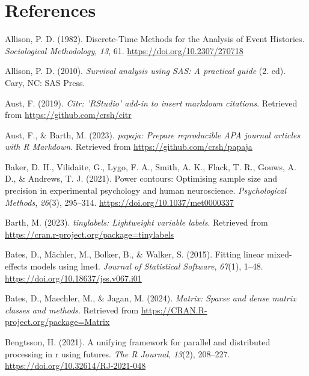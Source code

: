 \documentclass[
  man,floatsintext]{apa6}
\newlength{\cslhangindent}
\newenvironment{CSLReferences}[2] %
 {\begin{list}{}{%
  \setlength{\itemindent}{0pt}
  \setlength{\leftmargin}{0pt}
  \setlength{\parsep}{0pt}
  \ifodd #1
   \setlength{\leftmargin}{\cslhangindent}
   \setlength{\itemindent}{-1\cslhangindent}
  \fi
  \setlength{\itemsep}{#2\baselineskip}}}
 {\end{list}}
\begin{document}
\newpage

\section{References}\label{references}

\label{refs}
\begin{CSLReferences}{1}{0}
Allison, P. D. (1982). Discrete-{Time Methods} for the {Analysis} of {Event Histories}. \emph{Sociological Methodology}, \emph{13}, 61. \url{https://doi.org/10.2307/270718}

Allison, P. D. (2010). \emph{Survival analysis using {SAS}: A practical guide} (2. ed). Cary, NC: SAS Press.

Aust, F. (2019). \emph{Citr: 'RStudio' add-in to insert markdown citations}. Retrieved from \url{https://github.com/crsh/citr}

Aust, F., \& Barth, M. (2023). \emph{{papaja}: {Prepare} reproducible {APA} journal articles with {R Markdown}}. Retrieved from \url{https://github.com/crsh/papaja}

Baker, D. H., Vilidaite, G., Lygo, F. A., Smith, A. K., Flack, T. R., Gouws, A. D., \& Andrews, T. J. (2021). Power contours: {Optimising} sample size and precision in experimental psychology and human neuroscience. \emph{Psychological Methods}, \emph{26}(3), 295--314. \url{https://doi.org/10.1037/met0000337}

Barth, M. (2023). \emph{{tinylabels}: Lightweight variable labels}. Retrieved from \url{https://cran.r-project.org/package=tinylabels}

Bates, D., Mächler, M., Bolker, B., \& Walker, S. (2015). Fitting linear mixed-effects models using {lme4}. \emph{Journal of Statistical Software}, \emph{67}(1), 1--48. \url{https://doi.org/10.18637/jss.v067.i01}

Bates, D., Maechler, M., \& Jagan, M. (2024). \emph{Matrix: Sparse and dense matrix classes and methods}. Retrieved from \url{https://CRAN.R-project.org/package=Matrix}

Bengtsson, H. (2021). A unifying framework for parallel and distributed processing in r using futures. \emph{The R Journal}, \emph{13}(2), 208--227. \url{https://doi.org/10.32614/RJ-2021-048}


\end{CSLReferences}
\end{document}
